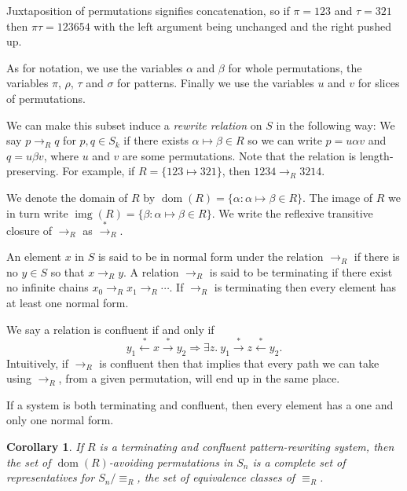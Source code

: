 \documentclass[openany, a4paper, 11pt, english]{article}
\newcommand{\patternrule}{ \mapsto \!}
\newtheorem{corollary}[theorem]{Corollary}
\theoremstyle{definition}
\newcommand{\Sym}{S}
\newcommand{\from}{\leftarrow}
\newcommand{\tostar}{\stackrel{*}{\to}}
\newcommand{\fromstar}{\stackrel{*}{\from}}
\DeclareMathOperator{\dom}{dom}
\DeclareMathOperator{\img}{img}
\begin{document}
Juxtaposition of permutations signifies concatenation, so if $\pi=123$ and
$\tau=321$ then $\pi\tau=123654$ with the left argument being unchanged and the
right pushed up.

As for notation, we use the variables $\alpha$ and $\beta$ for whole permutations, 
the variables $\pi$, $\rho$, $\tau$ and $\sigma$ for patterns.
Finally we use the variables $u$ and $v$ for slices of permutations.

We can make this subset induce a \emph{rewrite relation} on $\Sym$ in the following way: We say
$p \to_R q$ for $p, q \in \Sym_k$ if there exists $\alpha \patternrule \beta \in R$ so
we can write $p = u \alpha v$ and $q = u \beta v$, where
$u$ and $v$ are some permutations.  Note that the relation is
length-preserving. For example, if $R = \{123 \patternrule 321\}$, then $1234 \to_R 3214$. 

We denote the domain of $R$ by $\dom(R) = \{\alpha : \alpha \patternrule
\beta \in R\}$. The image of $R$ we in turn write $\img(R) = \{\beta : \alpha
\patternrule \beta \in R\}$. We write the reflexive transitive closure of
$\to_R$ as $\tostar_R$. 

An element $x$ in $\Sym$ is said to be in normal form under the relation $\to_R$
if there is no $y \in \Sym$ so that $x \to_R y$. A relation $\to_R$ is said to be
terminating if there exist no infinite chains $x_0 \to_R x_1 \to_R \cdots$. If
$\to_R$ is terminating then every element has at least one normal form. 

We say a relation is confluent if and only if
$$
    y_1 \fromstar x \tostar y_2 \Longrightarrow 
    \exists z. \  y_1 \tostar z \fromstar y_2.
$$
Intuitively, if $\to_R$ is confluent then that implies that every path we can
take using $\to_R$, from a given permutation, will end up in the same place. 

If a system is both terminating and confluent, then every element has a one and
only one normal form.

\begin{corollary}
    If $R$ is a terminating and confluent pattern-rewriting system, then the set
    of $\dom(R)$-avoiding permutations in $S_n$ is a complete set of
    representatives for $S_n / \equiv_R$, the set of equivalence classes of
    $\equiv_R$.
\end{corollary}
\end{document}
